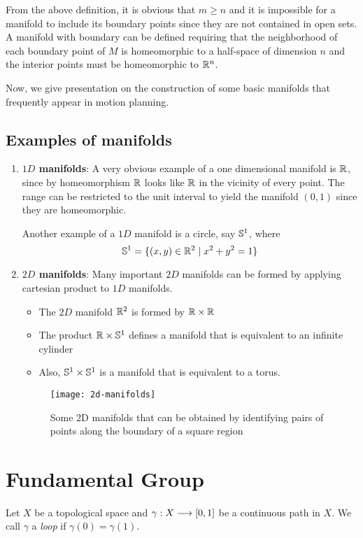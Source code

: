From the above definition, it is obvious that $m \ge n$ and it is impossible for a manifold to include its boundary points since they are not contained in open sets.
\linebreak
A manifold with boundary can be defined requiring that the neighborhood of each boundary point of $M$ is homeomorphic to a half-space of dimension $n$ and the interior points must be homeomorphic to $\mathbb{R}^n$.

Now, we give presentation on the construction of some basic manifolds that frequently appear in motion planning.

\subsection{Examples of manifolds}

\begin{enumerate}
    \item \textbf{$1D$ manifolds}: A very obvious example of a one dimensional manifold is $\mathbb{R}$, since by homeomorphism $\mathbb{R}$ looks like $\mathbb{R}$ in the vicinity of every point. The range can be restricted to the unit interval to yield the manifold $(0,1)$ since they are homeomorphic.

    Another example of a $1D$ manifold is a circle, say $\mathbb{S}^1$, where
    \[
        \mathbb{S}^1 = \{(x,y) \in \mathbb{R}^2 \mid x^2 + y^2  = 1\}
    \]
    \item \textbf{$2D$ manifolds}: Many important $2D$ manifolds can be formed by applying cartesian product to $1D$ manifolds. 
    \begin{itemize}
        \item The $2D$ manifold $\mathbb{R}^2$ is formed by $\mathbb{R} \times \mathbb{R}$ 
        \item The product $\mathbb{R} \times \mathbb{S}^1$ defines a manifold that is equivalent to an infinite cylinder
        \item Also, $\mathbb{S}^1 \times \mathbb{S}^1$ is a manifold that is equivalent to a torus.
    \end{itemize}
    \begin{figure}[H]
        \centering
        \texttt{[image: 2d-manifolds]}
        \caption[2D manifolds]{Some 2D manifolds that can be obtained by identifying pairs of points along the boundary of a square region\cite{lavalle2006planning}}
    \end{figure}
\end{enumerate}


\section{Fundamental Group}
\begin{defn}[Loop]
    Let $X$ be a topological space and $\gamma : X \longrightarrow [0,1]$ be a continuous path in $X$. We call $\gamma$ a \textit{loop} if $\gamma(0) = \gamma(1)$.
\end{defn}

